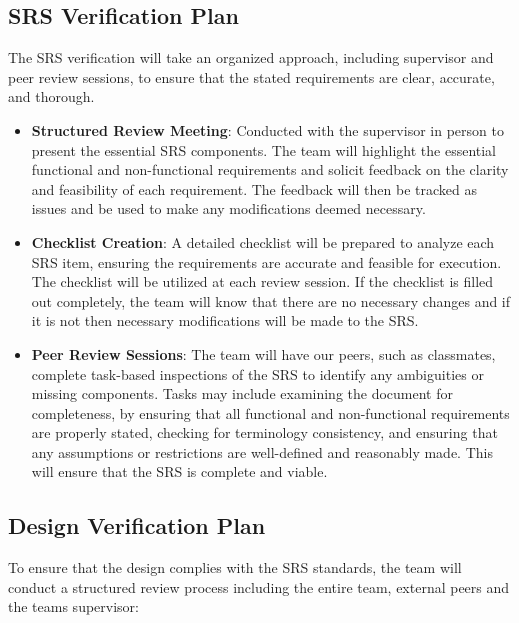\documentclass[12pt, titlepage]{article}
\begin{document}
\newpage
\subsection{SRS Verification Plan}

\noindent The SRS verification will take an organized approach, including supervisor and peer review sessions, to ensure that the stated requirements are clear, accurate, and thorough. 

\begin{itemize}
    \item \textbf{Structured Review Meeting}: Conducted with the supervisor in person to present the essential SRS components. The team will highlight the essential functional and non-functional requirements and solicit feedback on the clarity and feasibility of each requirement. The feedback will then be tracked as issues and be used to make any modifications deemed necessary.
    \item \textbf{Checklist Creation}: A detailed checklist will be prepared to analyze each SRS item, ensuring the requirements are accurate and feasible for execution. The checklist will be utilized at each review session. If the checklist is filled out completely, the team will know that there are no necessary changes and if it is not then necessary modifications will be made to the SRS.
    \item \textbf{Peer Review Sessions}: The team will have our peers, such as classmates, complete task-based inspections of the SRS to identify any ambiguities or missing components. Tasks may include examining the document for completeness, by ensuring that all functional and non-functional requirements are properly stated, checking for terminology consistency, and ensuring that any assumptions or restrictions are well-defined and reasonably made. This will ensure that the SRS is complete and viable. 
\end{itemize}

\subsection{Design Verification Plan}

\noindent To ensure that the design complies with the SRS standards, the team will conduct a structured review process including the entire team, external peers and the teams supervisor:
\end{document}
